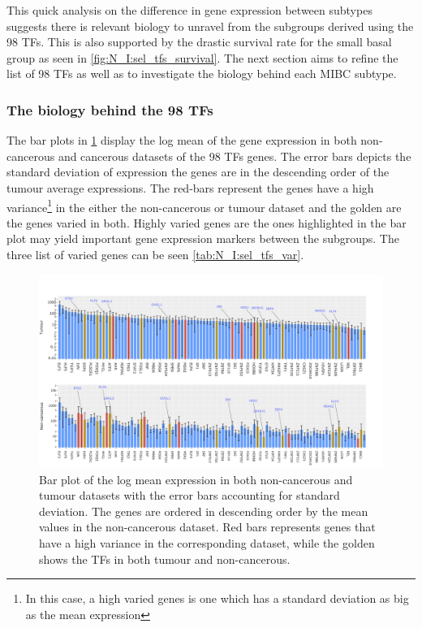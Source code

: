 This quick analysis on the difference in gene expression between subtypes suggests there is relevant biology to unravel from the subgroups derived using the 98 TFs. This is also supported by the drastic survival rate for the small basal group as seen in \cref{fig:N_I:sel_tfs_survival}. The next section aims to refine the list of 98 TFs as well as to investigate the biology behind each MIBC subtype.

\subsubsection{The biology behind the 98 TFs}

The bar plots in \cref{fig:N_I:sel_tfs_var} display the log mean of the gene expression in both non-cancerous and cancerous datasets of the 98 TFs genes. The error bars depicts the standard deviation of expression the genes are in the descending order of the tumour average expressions. The red-bars represent the genes have a high variance\footnote{In this case, a high varied genes is one which has a standard deviation as big as the mean expression} in the either the non-cancerous or tumour dataset and the golden are the genes varied in both. Highly varied genes are the ones highlighted in the bar plot may yield important gene expression markers between the subgroups. The three list of varied genes can be seen \cref{tab:N_I:sel_tfs_var}.


\begin{figure}[!ht]   
\centering
\includegraphics[width=1.0\textwidth,height=1.0\textheight,keepaspectratio]{Sections/Network_I/Resources/selective_pruning/sel_tfs_var_tum_healthy.png}
  \caption{Bar plot of the log mean expression in both non-cancerous and tumour datasets with the error bars accounting for standard deviation. The genes are ordered in descending order by the mean values in the non-cancerous dataset. Red bars represents genes that have a high variance in the corresponding dataset, while the golden shows the TFs in both tumour and non-cancerous.}
\label{fig:N_I:sel_tfs_var}
\end{figure}

